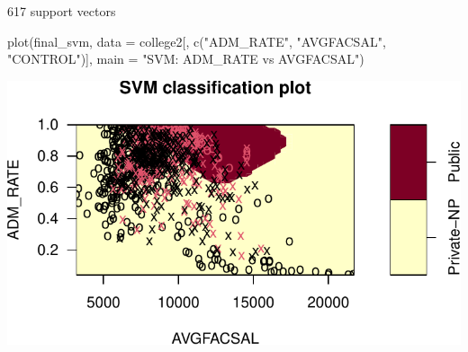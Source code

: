 \documentclass[
  letterpaper,
  DIV=11,
  numbers=noendperiod]{scrartcl}
\newenvironment{Shaded}{\begin{snugshade}}{\end{snugshade}}
\newcommand{\AttributeTok}[1]{\textcolor[rgb]{0.40,0.45,0.13}{#1}}
\newcommand{\FunctionTok}[1]{\textcolor[rgb]{0.28,0.35,0.67}{#1}}
\newcommand{\NormalTok}[1]{\textcolor[rgb]{0.00,0.23,0.31}{#1}}
\newcommand{\StringTok}[1]{\textcolor[rgb]{0.13,0.47,0.30}{#1}}
\begin{document}
617 support vectors

\begin{Shaded}
\begin{Highlighting}[]
\FunctionTok{plot}\NormalTok{(final\_svm, }\AttributeTok{data =}\NormalTok{ college2[, }\FunctionTok{c}\NormalTok{(}\StringTok{"ADM\_RATE"}\NormalTok{, }\StringTok{"AVGFACSAL"}\NormalTok{, }\StringTok{"CONTROL"}\NormalTok{)],}
     \AttributeTok{main =} \StringTok{"SVM: ADM\_RATE vs AVGFACSAL"}\NormalTok{)}
\end{Highlighting}
\end{Shaded}

\includegraphics{Final_627_Tshiani_files/figure-pdf/unnamed-chunk-23-1.pdf}
\end{document}
